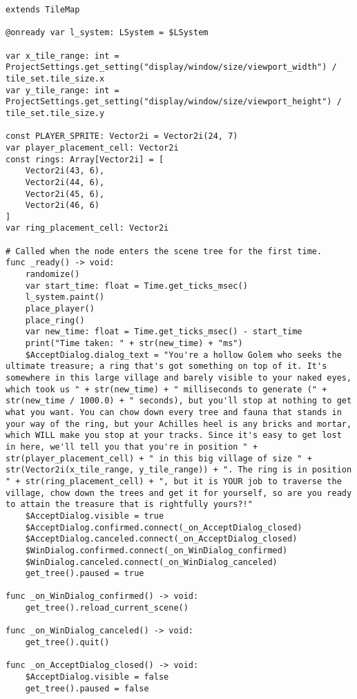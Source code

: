 \begin{lstlisting}
extends TileMap

@onready var l_system: LSystem = $LSystem

var x_tile_range: int = ProjectSettings.get_setting("display/window/size/viewport_width") / tile_set.tile_size.x
var y_tile_range: int = ProjectSettings.get_setting("display/window/size/viewport_height") / tile_set.tile_size.y

const PLAYER_SPRITE: Vector2i = Vector2i(24, 7)
var player_placement_cell: Vector2i
const rings: Array[Vector2i] = [
	Vector2i(43, 6),
	Vector2i(44, 6),
	Vector2i(45, 6),
	Vector2i(46, 6)
]
var ring_placement_cell: Vector2i

# Called when the node enters the scene tree for the first time.
func _ready() -> void:
	randomize()
	var start_time: float = Time.get_ticks_msec()
	l_system.paint()
	place_player()
	place_ring()
	var new_time: float = Time.get_ticks_msec() - start_time
	print("Time taken: " + str(new_time) + "ms")
	$AcceptDialog.dialog_text = "You're a hollow Golem who seeks the ultimate treasure; a ring that's got something on top of it. It's somewhere in this large village and barely visible to your naked eyes, which took us " + str(new_time) + " milliseconds to generate (" + str(new_time / 1000.0) + " seconds), but you'll stop at nothing to get what you want. You can chow down every tree and fauna that stands in your way of the ring, but your Achilles heel is any bricks and mortar, which WILL make you stop at your tracks. Since it's easy to get lost in here, we'll tell you that you're in position " + str(player_placement_cell) + " in this big village of size " + str(Vector2i(x_tile_range, y_tile_range)) + ". The ring is in position " + str(ring_placement_cell) + ", but it is YOUR job to traverse the village, chow down the trees and get it for yourself, so are you ready to attain the treasure that is rightfully yours?!"
	$AcceptDialog.visible = true
	$AcceptDialog.confirmed.connect(_on_AcceptDialog_closed)
	$AcceptDialog.canceled.connect(_on_AcceptDialog_closed)
	$WinDialog.confirmed.connect(_on_WinDialog_confirmed)
	$WinDialog.canceled.connect(_on_WinDialog_canceled)
	get_tree().paused = true

func _on_WinDialog_confirmed() -> void:
	get_tree().reload_current_scene()

func _on_WinDialog_canceled() -> void:
	get_tree().quit()

func _on_AcceptDialog_closed() -> void:
	$AcceptDialog.visible = false
	get_tree().paused = false


\end{lstlisting}
